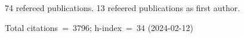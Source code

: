 74 refereed publications. 13 refeered publications as first author.

Total citations~=~3796; h-index~=~34 (2024-02-12)